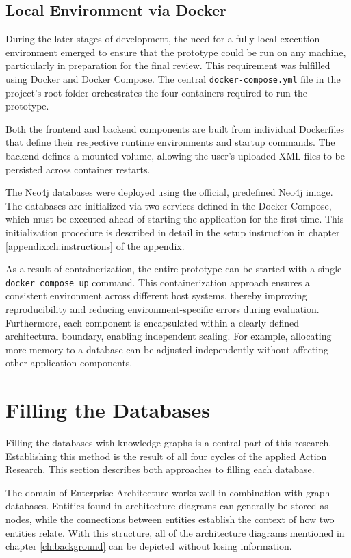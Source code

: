 \subsection{Local Environment via Docker}
\label{sub:docker}
During the later stages of development, the need for a fully local execution environment emerged to ensure that the prototype could be run on any machine, particularly in preparation for the final review. This requirement was fulfilled using Docker and Docker Compose. The central \texttt{docker-compose.yml} file in the project's root folder orchestrates the four containers required to run the prototype.

Both the frontend and backend components are built from individual Dockerfiles that define their respective runtime environments and startup commands. The backend defines a mounted volume, allowing the user's uploaded XML files to be persisted across container restarts.

The Neo4j databases were deployed using the official, predefined Neo4j image. The databases are initialized via two services defined in the Docker Compose, which must be executed ahead of starting the application for the first time. This initialization procedure is described in detail in the setup instruction in chapter \ref{appendix:ch:instructions} of the appendix.

As a result of containerization, the entire prototype can be started with a single \texttt{docker compose up} command.  This containerization approach ensures a consistent environment across different host systems, thereby improving reproducibility and reducing environment-specific errors during evaluation. Furthermore, each component is encapsulated within a clearly defined architectural boundary, enabling independent scaling. For example, allocating more memory to a database can be adjusted independently without affecting other application components.


\section{Filling the Databases}
\label{sec:filling_the_databases}
Filling the databases with knowledge graphs is a central part of this research. Establishing this method is the result of all four cycles of the applied Action Research. This section describes both approaches to filling each database.

The domain of Enterprise Architecture works well in combination with graph databases. Entities found in architecture diagrams can generally be stored as nodes, while the connections between entities establish the context of how two entities relate. With this structure, all of the architecture diagrams mentioned in chapter \ref{ch:background} can be depicted without losing information. \cite[pg. 67]{robinson2015graph} 

